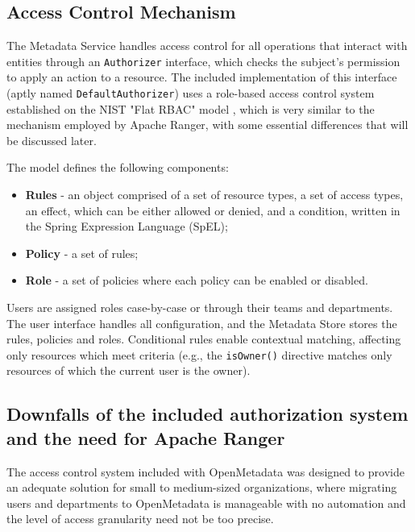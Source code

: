 \subsection{Access Control Mechanism}

The Metadata Service handles access control for all operations that interact with entities through an \texttt{Authorizer} interface, which checks the subject's permission to apply an action to a resource. The included implementation of this interface (aptly named \texttt{DefaultAuthorizer}) uses a role-based access control system established on the NIST "Flat RBAC" model \cite{nistRBAC2000Sandhu, buildingAccessControlForOpenMetadata2022Mathew}, which is very similar to the mechanism employed by Apache Ranger, with some essential differences that will be discussed later. 

The model defines the following components:

\begin{itemize}
    \item \textbf{Rules} - an object comprised of a set of resource types, a set of access types, an effect, which can be either allowed or denied, and a condition, written in the Spring Expression Language (SpEL);
    \item \textbf{Policy} - a set of rules;
    \item \textbf{Role} - a set of policies where each policy can be enabled or disabled.
\end{itemize}

Users are assigned roles case-by-case or through their teams and departments. The user interface handles all configuration, and the Metadata Store stores the rules, policies and roles. Conditional rules enable contextual matching, affecting only resources which meet criteria (e.g., the \texttt{isOwner()} directive matches only resources of which the current user is the owner). 

\subsection{Downfalls of the included authorization system and the need for Apache Ranger}

The access control system included with OpenMetadata was designed to provide an adequate solution for small to medium-sized organizations, where migrating users and departments to OpenMetadata is manageable with no automation and the level of access granularity need not be too precise.

